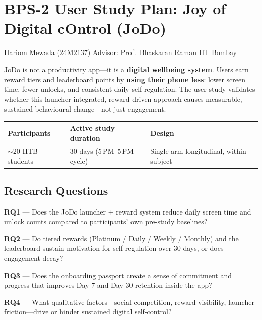 \documentclass[12pt, a4paper]{article}
\begin{document}
\section*{BPS-2 User Study Plan: Joy of Digital cOntrol (JoDo)}

{\color{gray}\small Hariom Mewada (24M2137) \textbar{} Advisor: Prof.\ Bhaskaran Raman \textbar{} IIT Bombay}

\bigskip

JoDo is not a productivity app---it is a \textbf{digital wellbeing system}. Users earn reward tiers and leaderboard points by \textbf{using their phone less}: lower screen time, fewer unlocks, and consistent daily self-regulation. The user study validates whether this launcher-integrated, reward-driven approach causes measurable, sustained behavioural change---not just engagement.

\medskip

\begin{center}
\renewcommand{\arraystretch}{1.4}
\begin{tabular}{lll}
\toprule
\textbf{Participants} & \textbf{Active study duration} & \textbf{Design} \\
\midrule
$\sim$20 IITB students & 30 days (5\,PM--5\,PM cycle) & Single-arm longitudinal, within-subject \\
\bottomrule
\end{tabular}
\end{center}

\subsection{Research Questions}

\begin{rqbox}
\textbf{RQ1} --- Does the JoDo launcher + reward system reduce daily screen time and unlock counts compared to participants' own pre-study baselines?
\end{rqbox}
\vspace{4pt}
\begin{rqbox}
\textbf{RQ2} --- Do tiered rewards (Platinum / Daily / Weekly / Monthly) and the leaderboard sustain motivation for self-regulation over 30 days, or does engagement decay?
\end{rqbox}
\vspace{4pt}
\begin{rqbox}
\textbf{RQ3} --- Does the onboarding passport create a sense of commitment and progress that improves Day-7 and Day-30 retention inside the app?
\end{rqbox}
\vspace{4pt}
\begin{rqbox}
\textbf{RQ4} --- What qualitative factors---social competition, reward visibility, launcher friction---drive or hinder sustained digital self-control?
\end{rqbox}
\end{document}
